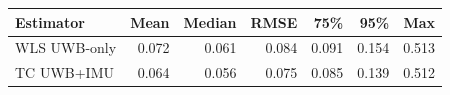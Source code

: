 \begin{tabular}{lrrrrrr}
\toprule
Estimator & Mean & Median & RMSE & 75\% & 95\% & Max \\
\midrule
WLS UWB-only & 0.072 & 0.061 & 0.084 & 0.091 & 0.154 & 0.513 \\
TC UWB+IMU & 0.064 & 0.056 & 0.075 & 0.085 & 0.139 & 0.512 \\
\bottomrule
\end{tabular}
